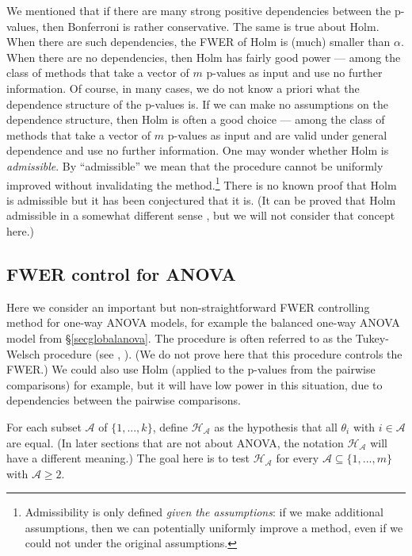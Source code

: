 \documentclass[11pt]{article}
\theoremstyle{plain}
\theoremstyle{definition}
\newcommand{\A}{\mathcal{A}}
\newcommand{\Hy}{\mathcal{H}}
\newcommand{\citp}{\citep}
\begin{document}
We mentioned that if there are many strong positive dependencies between the p-values, then Bonferroni is rather conservative. The same is true about Holm. When there are such dependencies, the FWER of Holm is (much) smaller than $\alpha$. When there are no dependencies, then Holm has fairly good power --- among the class of methods that take a vector of $m$ p-values as input and use no further information. Of course, in many cases, we do not know a priori what the dependence structure of the p-values is. If we can make no assumptions on the dependence structure, then  Holm is  often a good choice --- among the class of methods that take a vector of $m$ p-values as input and are valid under general dependence and use no further information. One may wonder whether Holm is \emph{admissible}. By ``admissible'' we mean that the procedure cannot be uniformly improved without invalidating the method.\footnote{Admissibility is only defined \emph{given the assumptions}: if we make additional assumptions, then we can potentially uniformly improve a method, even if we could not under the original assumptions.}
There is no known proof that Holm is admissible  but it has been conjectured that it is. (It can be proved that Holm admissible in a somewhat different sense \citp{goeman2021only}, but we will not consider that concept here.)



\subsection{FWER control for ANOVA}\label{secFWERanova}
Here we consider an important but non-straightforward FWER controlling method for one-way ANOVA models, for example the 
balanced one-way ANOVA model from \S\ref{secglobalanova}. The procedure is often referred to as the Tukey-Welsch procedure (see \citealp[][p.69]{hochberg1987multiple}, \citealp{fay2022statistical}). (We do not prove here that this procedure controls the FWER.) We  could also use Holm (applied to the p-values from the pairwise comparisons) for example, but it will have low power in this situation, due to dependencies between the pairwise comparisons.

For each subset $\mathcal{A}$ of $\{1,...,k\}$, define $\Hy_{\A}$ as the hypothesis that all $\theta_i$ with $i\in \A$ are equal. (In later sections that are not about ANOVA, the notation $\Hy_{\A}$ will have a different meaning.) The goal here is to test $\Hy_{\A}$ for every $\mathcal{A}\subseteq \{1,...,m\}$ with $\A\geq 2$.
\end{document}
